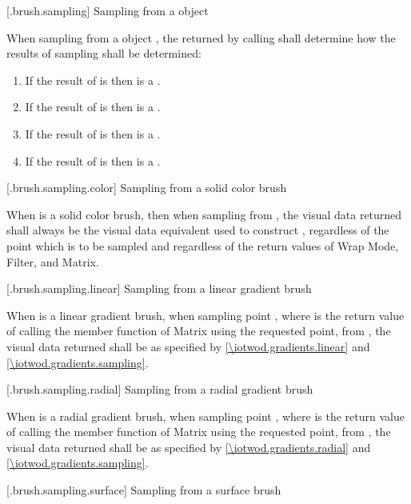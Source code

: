  [\iotwod.brush.sampling] {Sampling from a  object}

\pnum
When sampling from a  object , the  returned by calling  shall determine how the results of sampling shall be determined:
\begin{enumerate}
\item If the result of  is  then  is a .
\item If the result of  is  then  is a .
\item If the result of  is  then  is a .
\item If the result of  is  then  is a .
\end{enumerate}

 [\iotwod.brush.sampling.color] {Sampling from a solid color brush}

\pnum
When  is a solid color brush, then when sampling from , the visual data returned shall always be the visual data equivalent  used to construct , regardless of the point which is to be sampled and regardless of the return values of Wrap Mode, Filter, and Matrix.

 [\iotwod.brush.sampling.linear] {Sampling from a linear gradient brush}

\pnum
When  is a linear gradient brush, when sampling point , where  is the return value of calling the  member function of Matrix using the requested point, from , the visual data returned shall be as specified by \ref{\iotwod.gradients.linear} and \ref{\iotwod.gradients.sampling}.

 [\iotwod.brush.sampling.radial] {Sampling from a radial gradient brush}

\pnum
When  is a radial gradient brush, when sampling point , where  is the return value of calling the  member function of Matrix using the requested point, from , the visual data returned shall be as specified by \ref{\iotwod.gradients.radial} and \ref{\iotwod.gradients.sampling}.

 [\iotwod.brush.sampling.surface] {Sampling from a surface brush}

